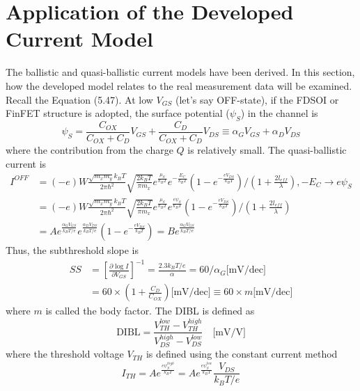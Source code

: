 \section{Application of the Developed Current Model}
The ballistic and quasi-ballistic current models have been derived. In this section, how the developed model relates to the real measurement data will be examined. Recall the Equation (5.47). At low $V_{GS}$ (let's say OFF-state), if the FDSOI or FinFET structure is adopted, the surface potential ($\psi_{S}$) in the channel is \begin{equation}
    \psi_{S} = \frac{C_{OX}}{C_{OX}+C_{D}}V_{GS} + \frac{C_{D}}{C_{OX}+C_{D}}V_{DS} \equiv \alpha_{G}V_{GS} + \alpha_{D}V_{DS}
\end{equation} where the contribution from the charge $Q$ is relatively small. The quasi-ballistic current is \begin{align}
    I^{OFF}& = (-e)W\frac{\sqrt{m_{x}m_{y}}k_{B}T}{2\pi\hbar^{2}}\sqrt{\frac{2k_{B}T}{\pi m_{x}}}e^{\frac{\mu_{S}}{k_{B}T}}e^{-\frac{E_{C}}{k_{B}T}}\left(1-e^{-\frac{eV_{DS}}{k_{B}T}}\right)/\left(1+\frac{2l_{eff}}{\lambda}\right),-E_{C}\rightarrow e\psi_{S}\nonumber\\
    & = (-e)W\frac{\sqrt{m_{x}m_{y}}k_{B}T}{2\pi\hbar^{2}}\sqrt{\frac{2k_{B}T}{\pi m_{x}}}e^{\frac{\mu_{S}}{k_{B}T}}e^{\frac{e\psi_{S}}{k_{B}T}}\left(1-e^{-\frac{eV_{DS}}{k_{B}T}}\right)/\left(1+\frac{2l_{eff}}{\lambda}\right)\nonumber\\
    & = Ae^{\frac{\alpha_{G}V_{GS}}{k_{B}T/e}}e^{\frac{\alpha_{D}V_{DS}}{k_{B}T/e}}\left(1-e^{-\frac{eV_{DS}}{k_{B}T}}\right) = Be^{\frac{\alpha_{G}V_{GS}}{k_{B}T/e}}
\end{align} Thus, the subthreshold slope is \begin{align}
    SS& = \left[\frac{\partial \log{I}}{\partial V_{GS}}\right]^{-1} = \frac{2.3k_{B}T/e}{\alpha} = 60/\alpha_{G}\text{[mV/dec]}\nonumber\\
    &= 60\times\left(1+\frac{C_{D}}{C_{OX}}\right)\text{[mV/dec]}\equiv 60\times m\text{[mV/dec]}
\end{align} where $m$ is called the body factor. The DIBL is defined as \begin{equation}
    \text{DIBL} = \frac{V_{TH}^{low}-V_{TH}^{high}}{V_{DS}^{high}-V_{DS}^{low}}\quad\text{[mV/V]}
\end{equation} where the threshold voltage $V_{TH}$ is defined using the constant current method \begin{equation}
    I_{TH} = Ae^{\frac{e\psi_{S}^{high}}{k_{B}T}} = Ae^{\frac{e\psi_{S}^{low}}{k_{B}T}}\frac{V_{DS}}{k_{B}T/e}

\end{equation}
